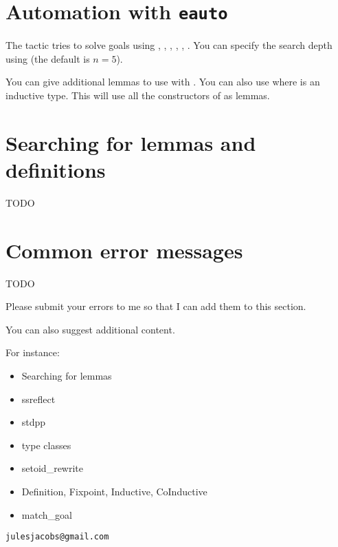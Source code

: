 \section{Automation with \texttt{eauto}}

The  tactic tries to solve goals using , , , , , .
You can specify the search depth using  (the default is $n=5$).

You can give  additional lemmas to use with .
You can also use  where  is an inductive type. This will use all the constructors of  as lemmas.

\section{Searching for lemmas and definitions}

TODO

\section{Common error messages}

TODO

Please submit your errors to me so that I can add them to this section.

You can also suggest additional content.

For instance:

\begin{itemize}
  \item Searching for lemmas
  \item ssreflect
  \item stdpp
  \item type classes
  \item setoid\_rewrite
  \item Definition, Fixpoint, Inductive, CoInductive
  \item match\_goal
\end{itemize}

\texttt{julesjacobs@gmail.com}



